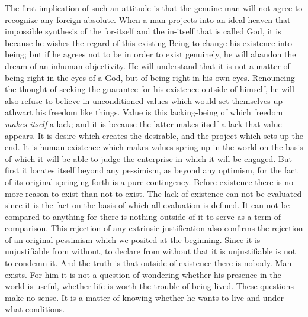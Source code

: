 \documentclass[11pt]{article}
\begin{document}
The first implication of such an attitude is that the genuine man will not agree to recognize any foreign absolute. When a man projects into an ideal heaven that impossible synthesis of the for-itself and the in-itself that is called God, it is because he wishes the regard of this existing Being to change his existence into being; but if he agrees not to be in order to exist genuinely, he will abandon the dream of an inhuman objectivity. He will understand that it is not a matter of being right in the eyes of a God, but of being right in his own eyes. Renouncing the thought of seeking the guarantee for his existence outside of himself, he will also refuse to believe in unconditioned values which would set themselves up athwart his freedom like things. Value is this lacking-being of which freedom \textit{makes itself} a lack; and it is because the latter makes itself a lack that value appears. It is desire which creates the desirable, and the project which sets up the end. It is human existence which makes values spring up in the world on the basis of which it will be able to judge the enterprise in which it will be engaged. But first it locates itself beyond any pessimism, as beyond any optimism, for the fact of its original springing forth is a pure contingency. Before existence there is no more reason to exist than not to exist. The lack of existence can not be evaluated since it is the fact on the basis of which all evaluation is defined. It can not be compared to anything for there is nothing outside of it to serve as a term of comparison. This rejection of any extrinsic justification also confirms the rejection of an original pessimism which we posited at the beginning. Since it is unjustifiable from without, to declare from without that it is unjustifiable is not to condemn it. And the truth is that outside of existence there is nobody. Man exists. For him it is not a question of wondering whether his presence in the world is useful, whether life is worth the trouble of being lived. These questions make no sense. It is a matter of knowing whether he wants to live and under what conditions.
\end{document}
